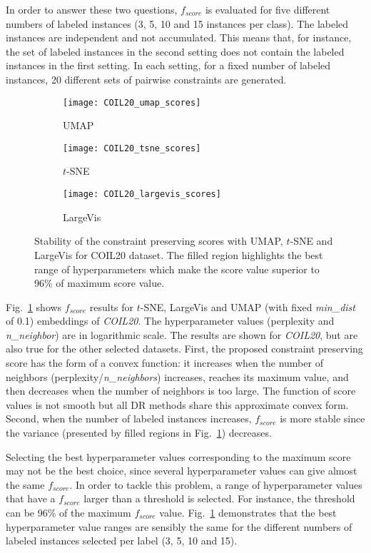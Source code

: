 In order to answer these two questions, $f_{score}$ is evaluated for five different numbers of labeled instances (3, 5, 10 and 15 instances per class).
The labeled instances are independent and not accumulated. This means that, for instance, the set of labeled instances in the second setting does not contain the labeled instances in the first setting.
In each setting, for a fixed number of labeled instances, 20 different sets of pairwise constraints are generated.

\begin{figure}%
\begin{subfigure}[b]{0.32\linewidth}
     \centering
     \texttt{[image: COIL20\_umap\_scores]}
     \caption{UMAP}
\end{subfigure}
\hfill
\begin{subfigure}[b]{0.32\linewidth}
     \centering
     \texttt{[image: COIL20\_tsne\_scores]}
     \caption{$t$-SNE}
\end{subfigure}
\hfill
\begin{subfigure}[b]{0.32\linewidth}
     \centering
     \texttt{[image: COIL20\_largevis\_scores]}
     \caption{LargeVis}
\end{subfigure}
\caption{Stability of the constraint preserving scores with UMAP, $t$-SNE and LargeVis for COIL20 dataset.
The filled region highlights the best range of hyperparameters which make the score value superior to 96\% of maximum score value.}
\label{fig:score:stability:COIL20}
\end{figure}

Fig.~\ref{fig:score:stability:COIL20} shows $f_{score}$ results for $t$-SNE, LargeVis and UMAP (with fixed \emph{min\_dist} of 0.1) embeddings of \emph{COIL20}.
The hyperparameter values (perplexity and \emph{n\_neighbor}) are in logarithmic scale.
The results are shown for \emph{COIL20}, but are also true for the other selected datasets.
First, the proposed constraint preserving score has the form of a convex function: it increases when the number of neighbors (perplexity/\emph{n\_neighbors}) increases, reaches its maximum value, and then decreases when the number of neighbors is too large.
The function of score values is not smooth but all DR methods share this approximate convex form.
Second, when the number of labeled instances increases, $f_{score}$ is more stable since the variance (presented by filled regions in Fig.~\ref{fig:score:stability:COIL20}) decreases.

Selecting the best hyperparameter values corresponding to the maximum score may not be the best choice, since several hyperparameter values can give almost the same $f_{score}$.
In order to tackle this problem, a range of hyperparameter values that have a $f_{score}$ larger than a threshold is selected. For instance, the threshold can be 96\% of the maximum $f_{score}$ value.
Fig.~\ref{fig:score:stability:COIL20} demonstrates that the best hyperparameter value ranges are sensibly the same for the different numbers of labeled instances selected per label (3, 5, 10 and 15).


